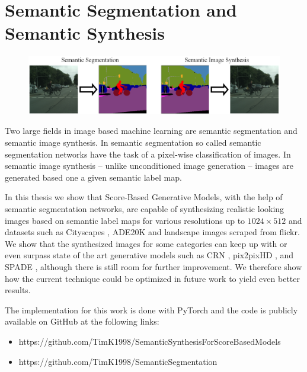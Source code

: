 \section{Semantic Segmentation and Semantic Synthesis} 
%
\begin{figure}[h!]
    \centering
    \includegraphics[width=1\textwidth]{Chapters/figures/sem_seg_vs_sem_synth.PNG}
\end{figure}
%
Two large fields in image based machine learning are semantic segmentation and semantic image synthesis. In semantic segmentation so called semantic segmentation networks have the task of a pixel-wise classification of images. In semantic image synthesis – unlike unconditioned image generation \cite{score_3} – images are generated based one a given semantic label map.

In this thesis we show that Score-Based Generative Models, with the help of semantic segmentation networks, are capable of synthesizing realistic looking images based on semantic label maps for various resolutions up to $1024\times512$ and datasets such as Cityscapes \cite{cityscapes}, ADE20K \cite{ade20k} and landscape images scraped from flickr. We show that the synthesized images for some categories can keep up with or even surpass state of the art generative models such as CRN \cite{crn}, pix2pixHD \cite{pix2pixHD}, and SPADE \cite{spade}, although there is still room for further improvement. We therefore show how the current technique could be optimized in future work to yield even better results. 

The implementation for this work is done with PyTorch and the code is publicly available on GitHub at the following links: 
\begin{itemize}
    \item https://github.com/TimK1998/SemanticSynthesisForScoreBasedModels
    \item https://github.com/TimK1998/SemanticSegmentation
\end{itemize}
